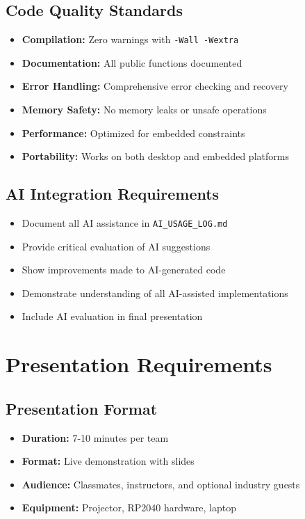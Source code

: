 \documentclass[11pt,a4paper]{article}
\begin{document}
\subsection{Code Quality Standards}
\begin{itemize}
    \item \textbf{Compilation:} Zero warnings with \texttt{-Wall -Wextra}
    \item \textbf{Documentation:} All public functions documented
    \item \textbf{Error Handling:} Comprehensive error checking and recovery
    \item \textbf{Memory Safety:} No memory leaks or unsafe operations
    \item \textbf{Performance:} Optimized for embedded constraints
    \item \textbf{Portability:} Works on both desktop and embedded platforms
\end{itemize}

\subsection{AI Integration Requirements}
\begin{itemize}
    \item Document all AI assistance in \texttt{AI\_USAGE\_LOG.md}
    \item Provide critical evaluation of AI suggestions
    \item Show improvements made to AI-generated code
    \item Demonstrate understanding of all AI-assisted implementations
    \item Include AI evaluation in final presentation
\end{itemize}

\section{Presentation Requirements}

\subsection{Presentation Format}
\begin{itemize}
    \item \textbf{Duration:} 7-10 minutes per team
    \item \textbf{Format:} Live demonstration with slides
    \item \textbf{Audience:} Classmates, instructors, and optional industry guests
    \item \textbf{Equipment:} Projector, RP2040 hardware, laptop
\end{itemize}
\end{document}
